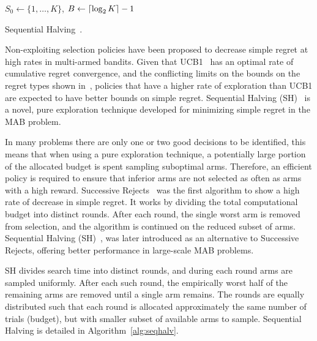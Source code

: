 \documentclass[a4paper]{llncs}
\DeclarePairedDelimiter{\ceil}{\lceil}{\rceil}
\DeclarePairedDelimiter{\floor}{\lfloor}{\rfloor}
\begin{document}
\IncMargin{1em}
\begin{algorithm2e}[b]
	\vspace{0.05cm}
	$S_0 \gets \{1,\dots,K\}$,
	$B \gets \ceil{\log_2{K}} - 1$														\;
	\BlankLine
  \caption[Sequential Halving]{Sequential Halving~\protect\cite{Karnin13SH}. \label{alg:seqhalv}}
\end{algorithm2e}
\DecMargin{1em}

Non-exploiting selection policies have been proposed to decrease simple regret at high rates in multi-armed bandits. Given that UCB1~\cite{auer2002using} has an optimal rate of cumulative regret convergence, and the conflicting limits on the bounds on the regret types shown in~\cite{Bubeck11Pure}, policies that have a higher rate of exploration than UCB1 are expected to have better bounds on simple regret. Sequential Halving (SH)~\cite{Karnin13SH} is a novel, pure exploration technique developed for minimizing simple regret in the MAB problem.

In many problems there are only one or two good decisions to be identified, this means that when using a pure exploration technique, a potentially large portion of the allocated budget is spent sampling suboptimal arms. Therefore, an efficient policy is required to ensure that inferior arms are not selected as often as arms with a high reward. Successive Rejects~\cite{audibert2010best} was the first algorithm to show a high rate of decrease in simple regret. It works by dividing the total computational budget into distinct rounds. After each round, the single worst arm is removed from selection, and the algorithm is continued on the reduced subset of arms. Sequential Halving (SH)~\cite{Karnin13SH}, was later introduced as an alternative to Successive Rejects, offering better performance in large-scale MAB problems.

SH divides search time into distinct rounds, and during each round arms are sampled uniformly. After each such round, the empirically worst half of the remaining arms are removed until a single arm remains. The rounds are equally distributed such that each round is allocated approximately the same number of trials (budget), but with smaller subset of available arms to sample. Sequential Halving is detailed in Algorithm~\ref{alg:seqhalv}.
\end{document}
